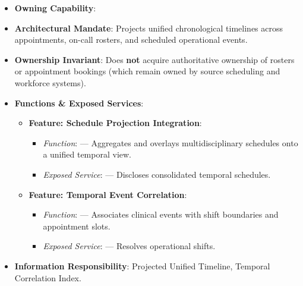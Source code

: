 \begin{itemize}

\item 
\textbf{Owning Capability}: \texttt{}



\item 
\textbf{Architectural Mandate}: Projects unified chronological timelines across appointments, on-call rosters, and scheduled operational events.



\item 
\textbf{Ownership Invariant}: Does \textbf{not} acquire authoritative ownership of rosters or appointment bookings (which remain owned by source scheduling and workforce systems).



\item 
\textbf{Functions \& Exposed Services}:


\begin{itemize}

\item 
\textbf{Feature: Schedule Projection Integration}:


\begin{itemize}

\item 
\emph{Function}: \texttt{} — Aggregates and overlays multidisciplinary schedules onto a unified temporal view.



\item 
\emph{Exposed Service}: \texttt{} — Discloses consolidated temporal schedules.



\end{itemize}


\item 
\textbf{Feature: Temporal Event Correlation}:


\begin{itemize}

\item 
\emph{Function}: \texttt{} — Associates clinical events with shift boundaries and appointment slots.



\item 
\emph{Exposed Service}: \texttt{} — Resolves operational shifts.



\end{itemize}


\end{itemize}


\item 
\textbf{Information Responsibility}: Projected Unified Timeline, Temporal Correlation Index.



\end{itemize}
\label{rad:ise:212}

